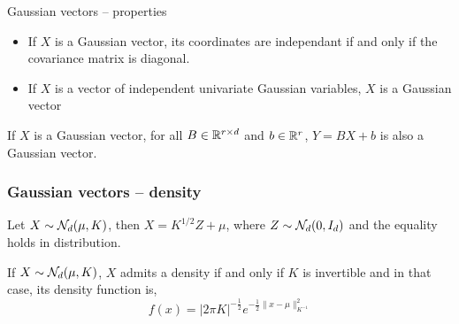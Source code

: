 \documentclass[handout, 10pt]{beamer} %
\begin{document}
  \begin{frame}{Gaussian vectors -- properties}

    \begin{corollary}
      \begin{itemize}
      \item If $X$ is a Gaussian vector, its coordinates are independant if and only if
        the covariance matrix is diagonal.

        \pause

      \item If $X$ is a vector of independent univariate
        Gaussian variables, $X$ is a Gaussian vector

      \end{itemize}
    \end{corollary}

    \pause

    \begin{proposition}
      If $X$ is a Gaussian vector, for all $B \in \mathbb{R}^{r \times d}$ and $b
      \in \mathbb{R}^r$, $Y = BX + b$ is also a Gaussian vector.
    \end{proposition}
  \end{frame}

  \begin{frame}
    \frametitle{Gaussian vectors -- density}

    \begin{corollary}
      Let $X \sim \mathcal{N}_d(\mu,K)$, then $X =
      K^{1/2}Z + \mu$, where $Z \sim \mathcal{N}_d(0,I_d)$ and the equality holds in
      distribution. 
    \end{corollary}

    \pause

    \begin{corollary}
      
      If $X \sim \mathcal{N}_d(\mu,K)$, $X$ admits a density if and only if $K$ is
      invertible and in that case, its density function is,
      $$f(x)=|2 \pi K|^{-\frac{1}{2}} e^{-\frac{1}{2}\|x - \mu\|_{K^{-1}}^{2}}$$
    \end{corollary}
  \end{frame}
\end{document}
